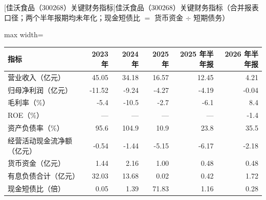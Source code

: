 \begin{center}\small\setlength{\tabcolsep}{3.4pt}
[佳沃食品（300268）关键财务指标]{佳沃食品（300268）关键财务指标（合并报表口径；两个半年报期均未年化；现金短债比 $=$ 货币资金 $\div$ 短期债务）}
\begin{adjustbox}{max width=\textwidth}
\begin{tabular}{@{}lrrrrr@{}}
\toprule
指标 & 2023 年 & 2024 年 & 2025 年 & 2025 年半年报 & 2026 年半年报 \\
\midrule
营业收入（亿元） & 45.05 & 34.18 & 16.57 & 12.45 & 4.21 \\
归母净利润（亿元） & -11.52 & -9.24 & -4.27 & -4.19 & -0.04 \\
毛利率（\%） & -5.4 & -10.5 & -2.7 & -6.1 & 8.4 \\
ROE（\%） & --- & --- & --- & --- & -1.4 \\
资产负债率（\%） & 95.6 & 104.9 & 10.9 & 23.8 & 35.5 \\
经营活动现金流净额（亿元） & -0.54 & -1.44 & -5.15 & -6.17 & -2.18 \\
货币资金（亿元） & 1.44 & 2.16 & 1.00 & 0.48 & 0.48 \\
有息负债合计（亿元） & 32.03 & 13.68 & 0.02 & 0.42 & 1.72 \\
现金短债比（倍） & 0.05 & 1.39 & 71.83 & 1.16 & 0.28 \\
\bottomrule
\end{tabular}
\end{adjustbox}
\end{center}

